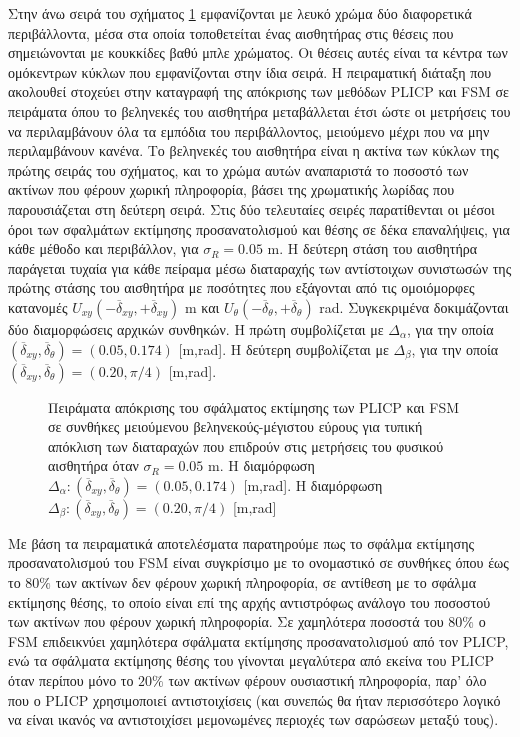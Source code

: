 Στην άνω σειρά του σχήματος \ref{fig:02_05_04:04} εμφανίζονται με λευκό χρώμα
δύο διαφορετικά περιβάλλοντα, μέσα στα οποία τοποθετείται ένας αισθητήρας στις
θέσεις που σημειώνονται με κουκκίδες βαθύ μπλε χρώματος. Οι θέσεις αυτές είναι
τα κέντρα των ομόκεντρων κύκλων που εμφανίζονται στην ίδια σειρά. Η πειραματική
διάταξη που ακολουθεί στοχεύει στην καταγραφή της απόκρισης των μεθόδων
PLICP και FSM σε πειράματα όπου το βεληνεκές του αισθητήρα
μεταβάλλεται έτσι ώστε οι μετρήσεις του να περιλαμβάνουν όλα τα εμπόδια του
περιβάλλοντος, μειούμενο μέχρι που να μην περιλαμβάνουν κανένα. Το βεληνεκές
του αισθητήρα είναι η ακτίνα των κύκλων της πρώτης σειράς του σχήματος, και το
χρώμα αυτών αναπαριστά το ποσοστό των ακτίνων που φέρουν χωρική πληροφορία,
βάσει της χρωματικής λωρίδας που παρουσιάζεται στη δεύτερη σειρά. Στις δύο
τελευταίες σειρές παρατίθενται οι μέσοι όροι των σφαλμάτων εκτίμησης
προσανατολισμού και θέσης σε δέκα επαναλήψεις, για κάθε μέθοδο και περιβάλλον,
για $\sigma_R = 0.05$ m. Η δεύτερη στάση του αισθητήρα παράγεται τυχαία για
κάθε πείραμα μέσω διαταραχής των αντίστοιχων συνιστωσών της πρώτης στάσης του
αισθητήρα με ποσότητες που εξάγονται από τις ομοιόμορφες κατανομές
$U_{xy}(-\overline{\delta}_{xy},+\overline{\delta}_{xy})$ m και
$U_{\theta}(-\overline{\delta}_{\theta},+\overline{\delta}_{\theta})$ rad.
Συγκεκριμένα δοκιμάζονται δύο διαμορφώσεις αρχικών συνθηκών. H πρώτη
συμβολίζεται με $\Delta_\alpha$, για την οποία
$(\overline{\delta}_{xy}, \overline{\delta}_{\theta}) = (0.05,0.174)$ [m,rad].
Η δεύτερη συμβολίζεται με $\Delta_\beta$, για την οποία
$(\overline{\delta}_{xy},\overline{\delta}_{\theta}) = (0.20,\pi/4)$ [m,rad].

\begin{figure}[]\centering
  
  \vspace{-2cm}
  \caption{\small Πειράματα απόκρισης του σφάλματος εκτίμησης των PLICP
           και FSM σε συνθήκες μειούμενου βεληνεκούς-μέγιστου εύρους
           για τυπική απόκλιση των διαταραχών που επιδρούν στις μετρήσεις του
           φυσικού αισθητήρα όταν $\sigma_R = 0.05$ m. Η διαμόρφωση
           $\Delta_\alpha: (\overline{\delta}_{xy}, \overline{\delta}_{\theta})
           = (0.05,0.174)$ [m,rad]. Η διαμόρφωση $\Delta_\beta:
           (\overline{\delta}_{xy},\overline{\delta}_{\theta}) = (0.20,\pi/4)$
           [m,rad]}
  \label{fig:02_05_04:04}
\end{figure}

Με βάση τα πειραματικά αποτελέσματα παρατηρούμε πως το σφάλμα εκτίμησης
προσανατολισμού του FSM είναι συγκρίσιμο με το ονομαστικό σε συνθήκες
όπου έως το $80\%$ των ακτίνων δεν φέρουν χωρική πληροφορία, σε αντίθεση με το
σφάλμα εκτίμησης θέσης, το οποίο είναι επί της αρχής αντιστρόφως ανάλογο του
ποσοστού των ακτίνων που φέρουν χωρική πληροφορία. Σε χαμηλότερα ποσοστά του
$80\%$ ο FSM επιδεικνύει χαμηλότερα σφάλματα εκτίμησης προσανατολισμού
από τον PLICP, ενώ τα σφάλματα εκτίμησης θέσης του γίνονται μεγαλύτερα από
εκείνα του PLICP όταν περίπου μόνο το $20\%$ των ακτίνων φέρουν ουσιαστική
πληροφορία, παρ' όλο που ο PLICP χρησιμοποιεί αντιστοιχίσεις (και συνεπώς θα
ήταν περισσότερο λογικό να είναι ικανός να αντιστοιχίσει μεμονωμένες περιοχές
των σαρώσεων μεταξύ τους).

